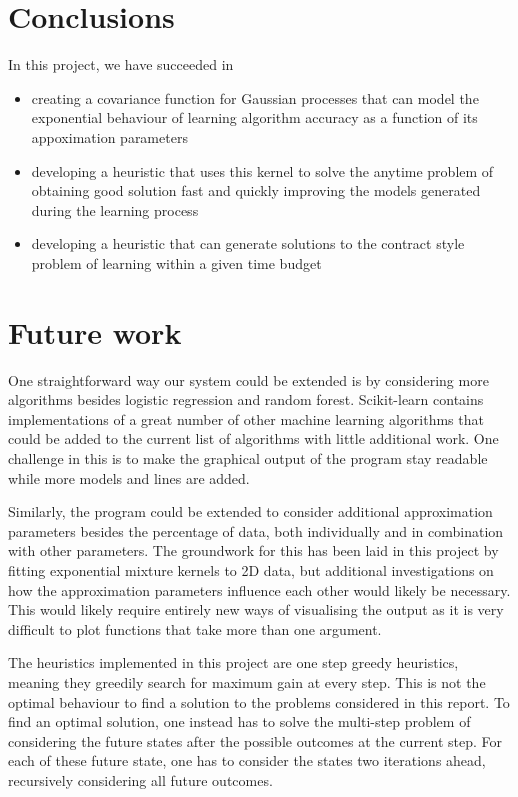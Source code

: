 \documentclass[a4paper,12pt,twoside,openright]{report}
\begin{document}
\section{Conclusions}
In this project, we have succeeded in
\begin{itemize}
	\item creating a covariance function for Gaussian processes that can model the exponential behaviour of learning algorithm accuracy as a function of its appoximation parameters
	\item developing a heuristic that uses this kernel to solve the anytime problem of obtaining good solution fast and quickly improving the models generated during the learning process
	\item developing a heuristic that can generate solutions to the contract style problem of learning within a given time budget
\end{itemize}




\section{Future work}
One straightforward way our system could be extended is by considering more algorithms besides logistic regression and random forest. Scikit-learn contains implementations of a great number of other machine learning algorithms that could be added to the current list of algorithms with little additional work. One challenge in this is to make the graphical output of the program stay readable while more models and lines are added.

Similarly, the program could be extended to consider additional approximation parameters besides the percentage of data, both individually and in combination with other parameters. The groundwork for this has been laid in this project by fitting exponential mixture kernels to 2D data, but additional investigations on how the approximation parameters influence each other would likely be necessary. This would likely require entirely new ways of visualising the output as it is very difficult to plot functions that take more than one argument.

The heuristics implemented in this project are one step greedy heuristics, meaning they greedily search for maximum gain at every step. This is not the optimal behaviour to find a solution to the problems considered in this report. To find an optimal solution, one instead has to solve the multi-step problem of considering the future states after the possible outcomes at the current step. For each of these future state, one has to consider the states two iterations ahead, recursively considering all future outcomes.
\end{document}
